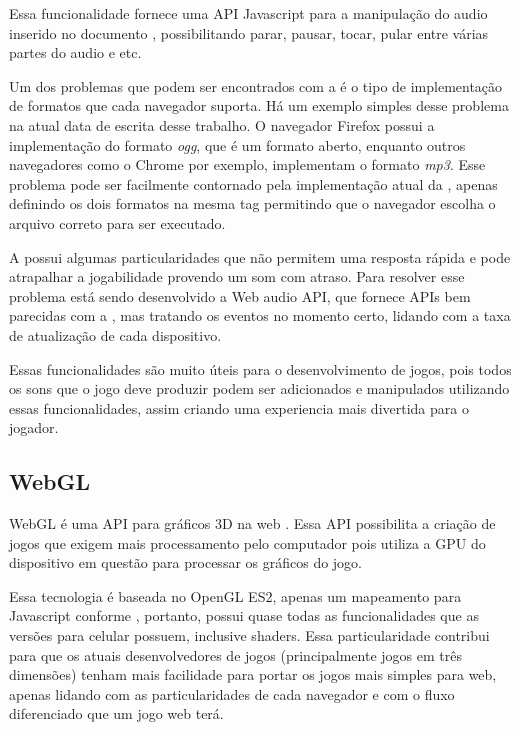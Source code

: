 Essa funcionalidade fornece uma API Javascript para a manipulação do
audio inserido no documento \cite{pfeiffer2010definitive}, possibilitando parar, pausar, tocar,
pular entre várias partes do audio e etc.

Um dos problemas que podem ser encontrados com a \tagaudio é o tipo de
implementação de formatos que cada navegador suporta. Há um exemplo
simples desse problema na atual data de escrita desse trabalho. O
navegador Firefox possui a implementação do formato \textit{ogg}, que
é um formato aberto, enquanto outros navegadores como o Chrome por
exemplo, implementam o formato \textit{mp3}. Esse problema pode ser
facilmente contornado pela implementação atual da \tagaudio,
apenas definindo os dois formatos na mesma tag permitindo que o
navegador escolha o arquivo correto para ser executado.

A \tagaudio possui algumas particularidades que não permitem uma
resposta rápida e pode atrapalhar a jogabilidade provendo um som com
atraso. Para resolver esse problema está sendo desenvolvido a
Web audio API, que fornece APIs bem parecidas com a \tagaudio, mas
tratando os eventos no momento certo, lidando com a taxa de
atualização de cada dispositivo.

Essas funcionalidades são muito úteis para o desenvolvimento de jogos, pois
todos os sons que o jogo deve produzir podem ser adicionados e
manipulados utilizando essas funcionalidades, assim criando uma
experiencia mais divertida para o jogador.

\subsection{WebGL}

WebGL é uma API para gráficos 3D na web \cite{lubbers2010pro}. Essa
API possibilita a criação de jogos que exigem mais processamento pelo
computador pois utiliza a GPU do dispositivo em questão para processar
os gráficos do jogo.

Essa tecnologia é baseada no OpenGL ES2, apenas um mapeamento para
Javascript conforme , portanto, possui
quase todas as funcionalidades que as versões para celular possuem,
inclusive shaders. Essa particularidade contribui
para que os atuais desenvolvedores de jogos (principalmente jogos em
três dimensões) tenham mais facilidade para portar os jogos mais
simples para web, apenas lidando com as particularidades de cada
navegador e com o fluxo diferenciado que um jogo web terá.

